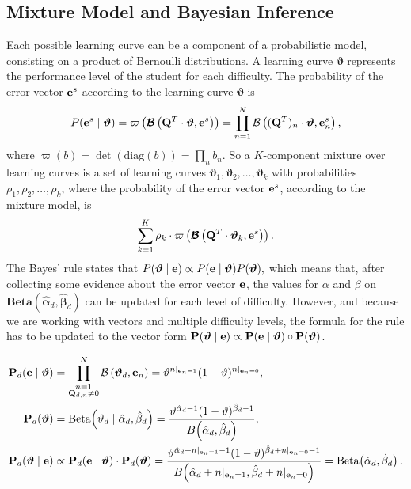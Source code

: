 \documentclass{article}
\newcommand{\0}{\mathbbold{0}}
\newcommand{\1}{\mathds{1}}
\newcommand{\diag}[1]{\text{diag}\!\left(#1\right)}
\newcommand{\Beta}[2]{\text{Beta}\!\left(#1,#2\right)}
\newcommand{\BBeta}[2]{\textbf{Beta}\!\left(#1,#2\right)}
\begin{document}
\subsection{Mixture Model and Bayesian Inference}
Each possible learning curve can be a component of a probabilistic model, consisting on a product of Bernoulli distributions.
A learning curve $\boldsymbol{\vartheta}$ represents the performance level of the student for each difficulty.
The probability of the error vector ${\bf e}^s$ according to the learning curve $\boldsymbol{\vartheta}$ is
$$ P({\bf e}^s \mid \boldsymbol{\vartheta}) = \varpi\left(\boldsymbol{\mathcal{B}}\left({\bf Q}^T \cdot \boldsymbol{\vartheta}, {\bf e}^s\right)\right) = \prod_{n=1}^{N} \mathcal{B}\left(({\bf Q}^T)_n \cdot \boldsymbol{\vartheta}, {\bf e}^s_n \right),$$
where $\varpi(b) = \det\!\left(\diag{b}\right) = \prod_n b_n$.
So a $K$-component mixture over learning curves is a set of learning curves $\boldsymbol{\vartheta}_1, \boldsymbol{\vartheta}_2, \dots, \boldsymbol{\vartheta}_k$ with probabilities $\rho_1, \rho_2, \dots, \rho_k$, where the probability of the error vector ${\bf e}^s$, according to the mixture model, is
$$ \sum_{k=1}^K \rho_k \cdot \varpi\left(\boldsymbol{\mathcal{B}}\left({\bf Q}^T \cdot \boldsymbol{\vartheta}_k, {\bf e}^s\right)\right). $$
The Bayes' rule states that $ P(\boldsymbol{\vartheta} \mid {\bf e}) \propto P({\bf e} \mid \boldsymbol{\vartheta}) P({\boldsymbol \vartheta}), $ which means that, after collecting some evidence about the error vector ${\bf e}$, the values for $\alpha$ and $\beta$ on $\BBeta{\boldsymbol{\hat{\alpha}}_d}{\boldsymbol{\hat{\beta}}_d}$ can be updated for each level of difficulty.
However, and because we are working with vectors and multiple difficulty levels, the formula for the rule has to be updated to the vector form ${\bf P}(\boldsymbol{\vartheta} \mid {\bf e}) \propto {\bf P}({\bf e} \mid \boldsymbol{\vartheta}) \circ {\bf P}({\boldsymbol \vartheta})$.

\begin{align*}
    {\bf P}_d({\bf e} \mid \boldsymbol{\vartheta}) &= \prod_{\substack{n=1 \\ {\bf Q}_{d, n} \ne 0}}^N \mathcal{B}\left(\boldsymbol{\vartheta}_d, {\bf e}_n \right) = \vartheta^{n|_{{\bf e}_n = 1}}(1 - \vartheta)^{n|_{{\bf e}_n = 0}}, \\
    {\bf P}_d(\boldsymbol{\vartheta}) &= \Beta{\vartheta_d \mid \hat{\alpha}_d}{\hat{\beta}_d} = \frac{\vartheta^{\hat{\alpha}_d - 1}(1 - \vartheta)^{\hat{\beta}_d - 1}}{B\!\left(\hat{\alpha}_d,\hat{\beta}_d\right)}, \\
    {\bf P}_d(\boldsymbol{\vartheta} \mid {\bf e}) &\propto {\bf P}_d({\bf e} \mid \boldsymbol{\vartheta}) \cdot {\bf P}_d(\boldsymbol{\vartheta}) = \frac{\vartheta^{\hat{\alpha}_d + n|_{{\bf e}_n = 1} - 1}(1 - \vartheta)^{\hat{\beta}_d + n|_{{\bf e}_n = 0} - 1}}{B\!\left(\hat{\alpha}_d + n|_{{\bf e}_n = 1},\hat{\beta}_d + n|_{{\bf e}_n = 0}\right)} = \Beta{\dot{\alpha}_d}{\dot{\beta}_d}.
\end{align*}
\end{document}
